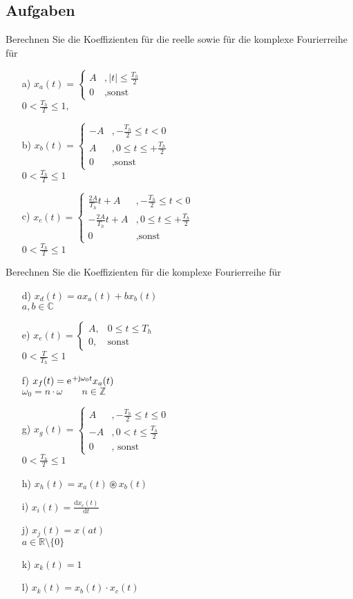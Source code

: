 \documentclass[11pt,a4paper,DIV=12]{scrartcl}
\newcommand{\diff}{\mathrm{d}}
\begin{document}
\subsection*{Aufgaben}
Berechnen Sie die Koeffizienten für die reelle sowie für die komplexe Fourierreihe für
\begin{itemize}
	\item[a) ] $x_{a}(t)=\begin{cases}A &,|t|\leq\frac{T_h}{2}\\0 &,\text{sonst}\end{cases}$\\$0<\frac{T_h}{T}\leq 1,$
	\item[b) ] $x_{b}(t)=\begin{cases}
		-A &,-\frac{T_h}{2}\leq t < 0\\
		A &,0 \leq t \leq +\frac{T_h}{2}\\
		0 &,\text{sonst}
	\end{cases}$\\$0 < \frac{T_h}{T} \leq 1$
	\item[c) ] $x_c(t)=\begin{cases}
		\frac{2A}{T_h}t+A&,-\frac{T_h}{2}\leq t <0\\
		-\frac{2A}{T_h}t+A&,0\leq t \leq +\frac{T_h}{2}\\
		0&,\text{sonst}
	\end{cases}$\\
	$0<\frac{T_h}{T}\leq 1$
\end{itemize}
Berechnen Sie die Koeffizienten für die komplexe Fourierreihe für
\begin{itemize}
	\item[d) ] $x_d(t) = ax_{a}(t)+bx_{b}(t)$\\
	$a,b\in\mathbb{C}$
	\item[e) ] $x_{e}(t)=\begin{cases}
		A, &0\leq t\leq T_h\\
		0, &\text{sonst}
	\end{cases}$\\$0< \frac{T}{T_h}\leq 1$
	\item[f)] $x_{f}(t)=\e^{+\im\omega_0 t}x_{a}(t)$\\
	$\omega_0 = n\cdot \omega \quad \quad n\in\mathbb{Z}$
	\item[g) ] $x_{g}(t) = \begin{cases}
		A &, -\frac{T_h}{2}\leq t \leq 0 \\
		-A &, 0<t\leq \frac{T_h}{2}\\
		0 &,\text{ sonst}
	\end{cases}$\\
	$0<\frac{T_h}{T}\leq 1$
	\item[h) ] $x_{h}(t) = x_{a}(t)\circledast x_{b}(t)$
	\item[i) ]$x_{i}(t)=\frac{\diff x_{c}(t)}{\diff t}$
	\item[j) ] $x_{j}(t)=x(at)$\\
	$a\in\mathbb{R}\setminus\{0\}$
	\item[k) ]$x_{k}(t)=1$
	\item[l) ] $x_{k}(t)=x_{b}(t)\cdot x_{c}(t)$
\end{itemize}
\end{document}
